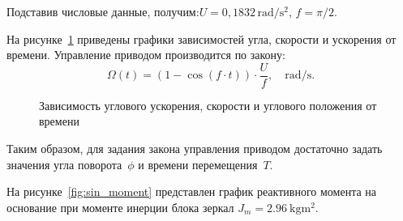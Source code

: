 Подставив числовые данные, получим:$U = 0{,}1832\,\si{\radian/ \second^2}$, $f = \pi/2$.




На рисунке~\cref{fig:sin_profile} приведены графики зависимостей угла, скорости и ускорения от времени. Управление приводом производится по закону:
\[
\Omega(t) = \left( 1 - \cos \left(f \cdot t \right)\right) \cdot \frac{U}{f}, \quad \si{\radian\per\second}.
\]

\begin{figure}[ht]
	\caption{Зависимость углового ускорения, скорости и углового положения от времени}
	\label{fig:sin_profile}
\end{figure}


Таким образом, для задания закона управления приводом достаточно задать значения угла поворота~$\phi$ и времени перемещения~$T$.

На рисунке~\cref{fig:sin_moment} представлен график реактивного момента на основание при моменте инерции блока зеркал $J_m = \SI{2.96}{\kilogram\metre\squared}$.

